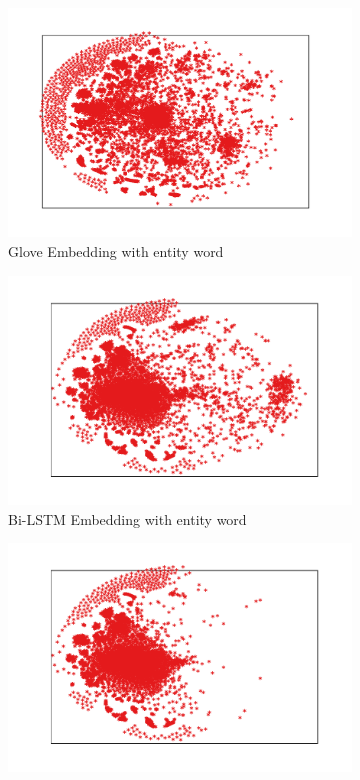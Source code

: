 \documentclass{article}
\begin{document}
\begin{figure}[t]
	\centering
	\begin{subfigure}[t]{0.24\textwidth}
		\includegraphics[width=\linewidth]{glove_embedding_positive_mirror.pdf}
		\caption{Glove Embedding with entity word}
		\label{fig:glove_positive}
	\end{subfigure} \hfil 
	\begin{subfigure}[t]{0.24\textwidth}
		\includegraphics[width=\linewidth]{bi_lstm_gold_positive.pdf}
		\caption{Bi-LSTM Embedding with entity word}
		\label{fig:bi_lstm_gold_positive}
	\end{subfigure} \hfil 
	 \begin{subfigure}[t]{0.24\textwidth}
		\includegraphics[width=\linewidth]{bi_lstm_mlp_positive.pdf}

\end{subfigure}
\end{figure}
\end{document}
